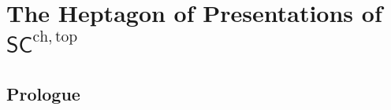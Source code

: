 
\providecommand{\SCchtop}{\mathsf{SC}^{\mathrm{ch},\mathrm{top}}}
\providecommand{\Fact}{\mathrm{Fact}}
\providecommand{\CoFact}{\mathrm{CoFact}}
\providecommand{\FM}{\mathrm{FM}}
\providecommand{\Conf}{\mathrm{Conf}}
\providecommand{\Ran}{\mathrm{Ran}}
\providecommand{\Obs}{\mathsf{Obs}}
\providecommand{\Hoch}{\mathrm{Hoch}}
\providecommand{\ChirHoch}{\mathrm{ChirHoch}}
\providecommand{\Bulk}{\mathrm{Bulk}}
\providecommand{\Bdy}{\mathrm{Bdy}}
\providecommand{\MC}{\mathrm{MC}}
\providecommand{\QME}{\mathrm{QME}}
\providecommand{\End}{\mathrm{End}}
\providecommand{\Mod}{\mathrm{Mod}}
\providecommand{\id}{\mathrm{id}}
\providecommand{\cA}{\mathcal{A}}
\providecommand{\cB}{\mathcal{B}}
\providecommand{\cC}{\mathcal{C}}
\providecommand{\cE}{\mathcal{E}}
\providecommand{\cZ}{\mathcal{Z}}
\providecommand{\cM}{\mathcal{M}}
\providecommand{\fg}{\mathfrak{g}}
\providecommand{\Lie}{\mathsf{Lie}}
\providecommand{\Ass}{\mathsf{Ass}}
\providecommand{\Com}{\mathsf{Com}}
\providecommand{\QCoh}{\operatorname{QCoh}}
\providecommand{\IndCoh}{\operatorname{IndCoh}}
\providecommand{\Dmod}{D\text{-}\mathsf{mod}}
\providecommand{\colim}{\operatorname{colim}}
\providecommand{\ChirAlg}{\mathsf{ChirAlg}}
\providecommand{\Stk}{\mathsf{Stk}}
\providecommand{\RSpec}{\mathbf{RSpec}}
\providecommand{\bMap}{\mathbf{Map}}
\providecommand{\HTQFT}{\mathsf{HT\text{-}QFT}}
\providecommand{\fsl}{\mathfrak{sl}}
\providecommand{\Repq}{\mathrm{Rep}_q}
\providecommand{\PhiFA}{\Phi^{\mathrm{FA}}}
\providecommand{\SpCh}{\mathrm{Sp}_{\mathrm{Ch}}}
\providecommand{\HolFA}{\mathrm{HolFA}}
\providecommand{\EdHolFA}{E_d\text{-}\HolFA}
\providecommand{\EnHolFA}{E_n\text{-}\HolFA}
\providecommand{\intSigma}{\textstyle\int_{\Sigma}}
\providecommand{\hCS}{\mathrm{hCS}}

\chapter{The Heptagon of Presentations of \texorpdfstring{$\SCchtop$}{SC}}
\label{ch:sc-chtop-heptagon}

\section*{Prologue}

